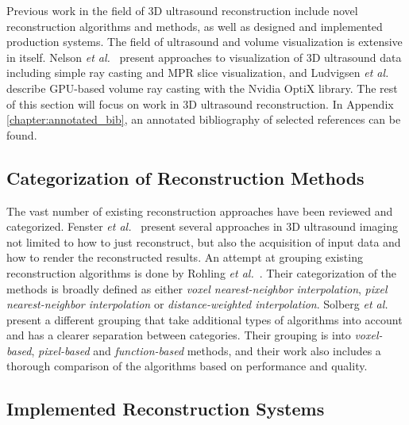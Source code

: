 Previous work in the field of 3D ultrasound reconstruction include novel reconstruction algorithms and methods, as well as designed and implemented production systems. The field of ultrasound and volume visualization is extensive in itself. Nelson \textit{et al.}\ \cite{nelson1993} present approaches to visualization of 3D ultrasound data including simple ray casting and MPR slice visualization, and Ludvigsen \textit{et al.}\ \cite{ludvigsen2010} describe GPU-based volume ray casting with the Nvidia OptiX library. The rest of this section will focus on work in 3D ultrasound reconstruction. In Appendix \ref{chapter:annotated_bib}, an annotated bibliography of selected references can be found.

\subsection{Categorization of Reconstruction Methods}

The vast number of existing reconstruction approaches have been reviewed and categorized. Fenster \textit{et al.}\ \cite{fenster1996} present several approaches in 3D ultrasound imaging not limited to how to just reconstruct, but also the acquisition of input data and how to render the reconstructed results. An attempt at grouping existing reconstruction algorithms is done by Rohling \textit{et al.}\ \cite{rohling1999}. Their categorization of the methods is broadly defined as either \textit{voxel nearest-neighbor interpolation}, \textit{pixel nearest-neighbor interpolation} or \textit{distance-weighted interpolation}. Solberg \textit{et al.}\ \cite{solberg2007} present a different grouping that take additional types of algorithms into account and has a clearer separation between categories. Their grouping is into \textit{voxel-based}, \textit{pixel-based} and \textit{function-based} methods, and their work also includes a thorough comparison of the algorithms based on performance and quality.

\subsection{Implemented Reconstruction Systems}

